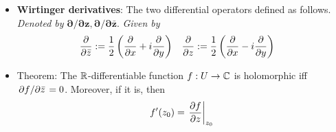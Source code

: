 \documentclass[../notes.tex]{subfiles}
\begin{document}
\begin{itemize}
\begin{itemize}
\begin{itemize}
\begin{equation*}
            \end{equation*}
        \end{itemize}
    \end{itemize}
    \item \textbf{Wirtinger derivatives}: The two differential operators defined as follows. \emph{Denoted by} $\bm{\partial/\partial z,\partial/\partial\bar{z}}$. \emph{Given by}
    \begin{align*}
        \pdv{\bar{z}} &:= \frac{1}{2}\left( \pdv{x}+i\pdv{y} \right)&
        \pdv{z} &:= \frac{1}{2}\left( \pdv{x}-i\pdv{y} \right)
    \end{align*}
    \item Theorem: The $\mathbb{R}$-differentiable function $f:U\to\mathbb{C}$ is holomorphic iff $\pdv*{f}{\bar{z}}=0$. Moreover, if it is, then
    \begin{equation*}
        f'(z_0) = \eval{\pdv{f}{z}}_{z_0}
    \end{equation*}
\end{itemize}
\end{document}
